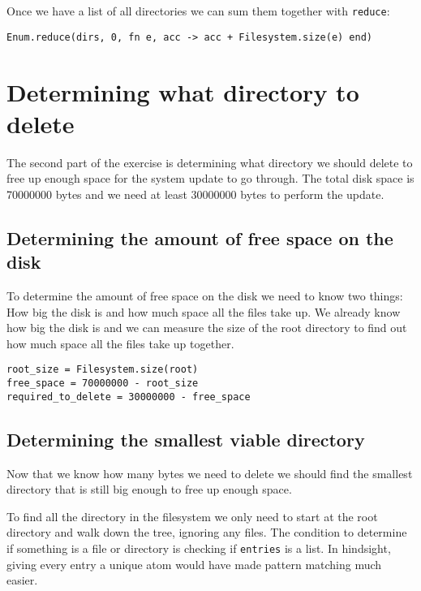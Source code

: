 \documentclass[a4paper,11pt]{article}
\begin{document}
Once we have a list of all directories we can sum them together with \texttt{reduce}:

\begin{verbatim}
Enum.reduce(dirs, 0, fn e, acc -> acc + Filesystem.size(e) end)
\end{verbatim}

\section*{Determining what directory to delete}

The second part of the exercise is determining what directory we should delete to free up enough space for the system update to go through.
The total disk space is 70000000 bytes and we need at least 30000000 bytes to perform the update.

\subsection*{Determining the amount of free space on the disk}

To determine the amount of free space on the disk we need to know two things: How big the disk is and how much space all the files take up.
We already know how big the disk is and we can measure the size of the root directory to find out how much space all the files take up together.

\begin{verbatim}
root_size = Filesystem.size(root)
free_space = 70000000 - root_size
required_to_delete = 30000000 - free_space
\end{verbatim}

\subsection*{Determining the smallest viable directory}

Now that we know how many bytes we need to delete we should find the smallest directory that is still big enough to free up enough space.

To find all the directory in the filesystem we only need to start at the root directory and walk down the tree, ignoring any files.
The condition to determine if something is a file or directory is checking if \texttt{entries} is a list.
In hindsight, giving every entry a unique atom would have made pattern matching much easier.
\end{document}
